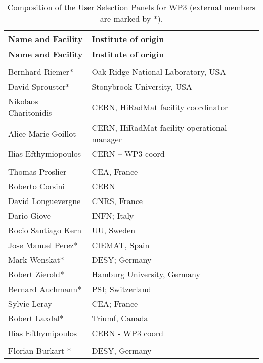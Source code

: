 \begin{longtable}{|L{0.48\textwidth}|C{0.48\textwidth}|}
\caption{Composition of the User Selection Panels for WP3 (external members are marked by *).}
\label{tab:usp-wp3}
    \\ \hline
    {\bf Name and Facility} & {\bf Institute of origin} \\ \hline
    \endfirsthead
    \hline
    {\bf Name and Facility} & {\bf Institute of origin} \\ \hline
    \endhead
    \hline
    \endfoot

      \\ \hline
    Bernhard Riemer*	& Oak Ridge National Laboratory, USA  \\ \hline
     David Sprouster*	&Stonybrook University, USA  \\ \hline
    Nikolaos Charitonidis	&CERN, HiRadMat facility coordinator  \\ \hline 
    Alice Marie Goillot	& CERN, HiRadMat facility operational manager  \\ \hline
    Ilias Efthymiopoulos	& CERN – WP3 coord  \\ \hline
     \\ \hline
    Thomas Proslier	& CEA, France  \\ \hline
    Roberto Corsini	& CERN  \\ \hline
    David Longuevergne	& CNRS, France  \\ \hline
    Dario Giove	& INFN; Italy  \\ \hline
    Rocio Santiago Kern	& UU, Sweden  \\ \hline
    Jose Manuel Perez*	& CIEMAT, Spain  \\ \hline
    Mark Wenskat*	& DESY; Germany  \\ \hline
    Robert Zierold*	& Hamburg University, Germany  \\ \hline
    Bernard Auchmann*	& PSI; Switzerland  \\ \hline
    Sylvie Leray	& CEA; France  \\ \hline
    Robert Laxdal*	& Triumf, Canada  \\ \hline
    Ilias Efthymipoulos	& CERN - WP3 coord  \\ \hline
     \\ \hline
    Florian Burkart *	& DESY, Germany  \\ \hline

\end{longtable}
